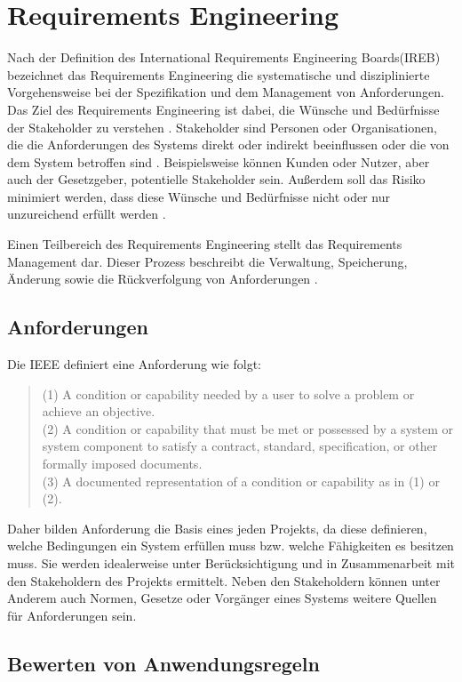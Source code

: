 \section{Requirements Engineering}
\label{chap:Requirements Engineering}
Nach der Definition des International Requirements Engineering Boards(IREB) bezeichnet das Requirements Engineering die systematische und disziplinierte Vorgehensweise bei der Spezifikation
und dem Management von Anforderungen. Das Ziel des Requirements Engineering ist dabei, die Wünsche und Bedürfnisse der Stakeholder zu verstehen \cite[S.30]{IREB_Glossary}. Stakeholder sind Personen 
oder Organisationen, die die Anforderungen des Systems direkt oder indirekt beeinflussen oder die von dem System betroffen sind \cite[S.33]{IREB_Glossary}. Beispielsweise können Kunden oder Nutzer, 
aber auch der Gesetzgeber, potentielle Stakeholder sein. Außerdem soll das Risiko minimiert werden, dass diese Wünsche und Bedürfnisse nicht oder nur unzureichend erfüllt werden \cite[S.30]{IREB_Glossary}.

Einen Teilbereich des Requirements Engineering stellt das Requirements Management dar. Dieser Prozess beschreibt die Verwaltung, Speicherung, Änderung sowie die Rückverfolgung 
von Anforderungen \cite[S.8]{IREB_Glossary}.

\subsection{Anforderungen}
Die IEEE definiert eine Anforderung wie folgt: 
\begin{quote}
    (1) A condition or capability needed by a user to solve a problem or achieve an objective.\\
    (2) A condition or capability that must be met
        or possessed by a system or system component to satisfy a contract, standard, specification, or other formally imposed documents.\\
    (3) A documented representation of a condition or capability as in (1) or (2). \cite[S.62]{IEEE_Glossary}
\end{quote}
Daher bilden Anforderung die Basis eines jeden Projekts, da diese definieren, welche Bedingungen ein System erfüllen muss bzw. welche Fähigkeiten es besitzen muss. Sie werden idealerweise 
unter Berücksichtigung und in Zusammenarbeit mit den Stakeholdern des Projekts ermittelt. Neben den Stakeholdern können unter Anderem auch Normen, Gesetze oder Vorgänger eines Systems 
weitere Quellen für Anforderungen sein.     

\subsection{Bewerten von Anwendungsregeln}
